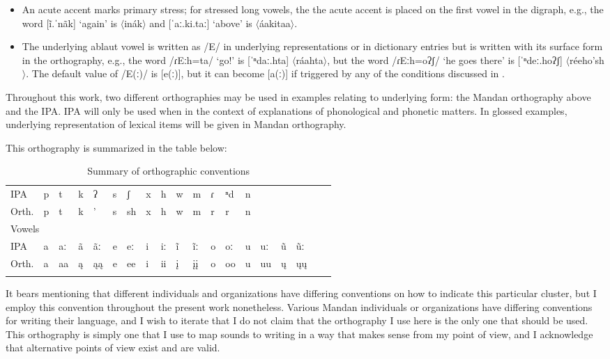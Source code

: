 \begin{exe}
\begin{itemize}
\item An acute accent marks primary stress; for stressed long vowels, the the acute accent is placed on the first vowel in the digraph, e.g., the word [ĩ.ˈnãk] `again' is $\langle${inák}$\rangle$ and [ˈaː.ki.taː] `above' is $\langle$áakitaa$\rangle$.

\item The underlying ablaut vowel is written as /E/ in underlying representations or in dictionary entries but is written with its surface form in the orthography, e.g., the word /ɾEːh=ta/ `go!' is [ˈⁿdaː.hta] $\langle${ráahta}$\rangle$, but the word /ɾEːh=oʔʃ/ `he goes there' is [ˈⁿdeː.hoʔʃ] $\langle${réeho'sh}$\rangle$. The default value of /E(ː)/ is [e(ː)], but it can become [a(ː)] if  triggered by any of the conditions discussed in .

\end{itemize}

\end{exe}

Throughout this work, two different orthographies may be used in examples relating to underlying form: the Mandan orthography above and the IPA. IPA will only be used when in the context of explanations of phonological and phonetic matters. In glossed examples, underlying representation of lexical items will be given in Mandan orthography.

This orthography is summarized in the table below:

\begin{table}
\caption{Summary of orthographic conventions}\label{summaryoforthography}
\begin{tabular}{lllllllllllllllllll}
\lsptoprule
\multicolumn{4}{l}{Consonants}\\
\midrule
IPA			&	p&	t&	 k&	ʔ& s&		ʃ&		x&	h&	w&	m&	ɾ& ⁿd& n\\
Orth.&	p&	t&	k&		'&	s&		sh&	x&	h&	w&	m&	r&	r&	n\\
\midrule
\multicolumn{4}{l}{Vowels}\\
\midrule
IPA&				a&	aː& ã& ãː&e&eː&i&iː&ĩ&ĩː&o&oː&u&uː&ũ&ũː\\
Orth.&	a&aa&ą&ąą& e&ee&i&ii&į&įį&o&oo&u&uu&ų&ųų\\
\lspbottomrule
\end{tabular}
\end{table}

It bears mentioning that different individuals and organizations have differing conventions on how to indicate this particular cluster, but I employ this convention throughout the present work nonetheless. Various Mandan individuals or organizations have differing conventions for writing their language, and I wish to iterate that I do not claim that the orthography I use here is the only one that should be used. This orthography is simply one that I use to map sounds to writing in a way that makes sense from my point of view, and I acknowledge that alternative points of view exist and are valid.


